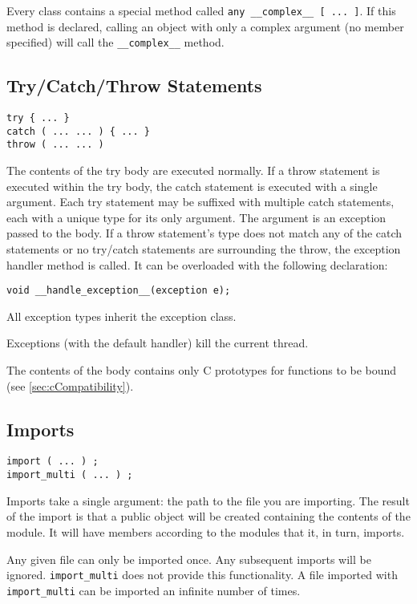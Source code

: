 \documentclass[10pt,a4paper]{article}
\begin{document}
Every class contains a special method called \verb|any __complex__ [ ... ]|. If this method is declared, calling an object with only a complex argument (no member specified) will call the \verb|__complex__| method.

\subsection{Try/Catch/Throw Statements}
\label{sec:tryCatch}
\begin{verbatim}
try { ... }
catch ( ... ... ) { ... }
throw ( ... ... )
\end{verbatim}

The contents of the try body are executed normally. If a throw statement is executed within the try body, the catch statement is executed with a single argument. Each try statement may be suffixed with multiple catch statements, each with a unique type for its only argument. The argument is an exception passed to the body. If a throw statement's type does not match any of the catch statements or no try/catch statements are surrounding the throw, the exception handler method is called. It can be overloaded with the following declaration:
\begin{verbatim}
void __handle_exception__(exception e);
\end{verbatim}

All exception types inherit the exception class.

Exceptions (with the default handler) kill the current thread. 

The contents of the body contains only C prototypes for functions to be bound (see \ref{sec:cCompatibility}).

\subsection{Imports}
\label{sec:imports}
\begin{verbatim}
import ( ... ) ;
import_multi ( ... ) ;
\end{verbatim}

Imports take a single argument: the path to the file you are importing. The result of the import is that a public object will be created containing the contents of the module. It will have members according to the modules that it, in turn, imports.

Any given file can only be imported once. Any subsequent imports will be ignored. \verb|import_multi| does not provide this functionality. A file imported with \verb|import_multi| can be imported an infinite number of times.
\end{document}
